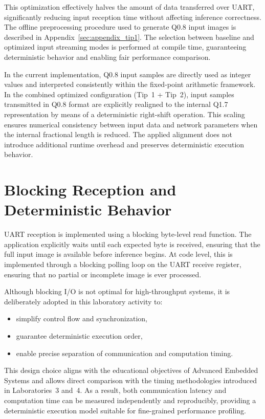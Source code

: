 This optimization effectively halves the amount of data transferred over UART,
significantly reducing input reception time without affecting inference
correctness.
The offline preprocessing procedure used to generate Q0.8 input images is
described in Appendix~\ref{sec:appendix_tip1}.
The selection between baseline and optimized input streaming modes is performed
at compile time, guaranteeing deterministic behavior and enabling fair
performance comparison.

In the current implementation, Q0.8 input samples are directly used as
integer values and interpreted consistently within the fixed-point
arithmetic framework.
In the combined optimized configuration (Tip~1 + Tip~2), input samples transmitted
in Q0.8 format are explicitly realigned to the internal Q1.7 representation by
means of a deterministic right-shift operation.
This scaling ensures numerical consistency between input data and network
parameters when the internal fractional length is reduced.
The applied alignment does not introduce additional runtime overhead and preserves
deterministic execution behavior.


\section{Blocking Reception and Deterministic Behavior}

UART reception is implemented using a blocking byte-level read function.
The application explicitly waits until each expected byte is received, ensuring
that the full input image is available before inference begins.
At code level, this is implemented through a blocking polling loop on the UART
receive register, ensuring that no partial or incomplete image is ever processed.

Although blocking I/O is not optimal for high-throughput systems, it is
deliberately adopted in this laboratory activity to:
\begin{itemize}
    \item simplify control flow and synchronization,
    \item guarantee deterministic execution order,
    \item enable precise separation of communication and computation timing.
\end{itemize}

This design choice aligns with the educational objectives of Advanced Embedded
Systems and allows direct comparison with the timing methodologies introduced in
Laboratories~3 and~4.
As a result, both communication latency and computation time can be measured
independently and reproducibly, providing a deterministic execution model
suitable for fine-grained performance profiling.


